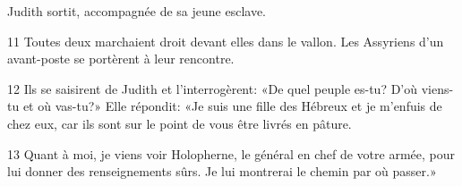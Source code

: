 Judith sortit, accompagnée de sa jeune esclave.

11 Toutes deux marchaient droit devant elles dans le vallon. Les Assyriens d'un avant-poste se portèrent à leur rencontre.

12 Ils se saisirent de Judith et l'interrogèrent: «De quel peuple es-tu? D'où viens-tu et où vas-tu?» Elle répondit: «Je suis une fille des Hébreux et je m'enfuis de chez eux, car ils sont sur le point de vous être livrés en pâture.

13 Quant à moi, je viens voir Holopherne, le général en chef de votre armée, pour lui donner des renseignements sûrs. Je lui montrerai le chemin par où passer.»





